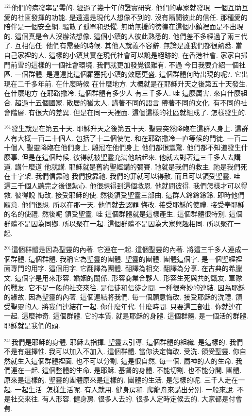 \documentclass{book}
\begin{document}
$^{121}$他們的病發率是零的.
經過了幾十年的證實研究.
他們的專家就發現.
一個互助互愛的社區發揮的功能.
是遠遠是現代人想像不到的.
沒有隔閡彼此的信任.
那種愛的陪伴是一個安全網.
驅散了孤單和恐懼.
無助無援的徬徨在這個小鎮裡面是不出現的.
這個真是令人沒辦法想像.
這個小鎮的人彼此熟悉的.
他們差不多經過了兩三代了.
互相信任.
他們有需要的時候.
其他人就義不容辭.
無論是誰我們都很熟悉.
當自己家裡的人.
這樣的小鎮其實在現代社會可以說是絕跡的.
在香港社會.
家家自掃門前雪的這樣的一個社會環境.
我們就更加發覺很難有.
不過 今日我要介紹一個社區.
一個群體.
是遠遠比這個羅塞托小鎮的效應更盛.
這個群體何時出現的呢?.
它出現在二千多年前.
在什麼時候 在什麼地方.
大概就是在耶穌升天之後第五十天發生.
在什麼地方 在耶路撒冷.
這個群體有多少人 有三千多人.
哇 這麼厲害.
來自什麼組合.
超過十五個國家.
散居的猶太人.
講著不同的語言 帶著不同的文化.
有不同的社會階層.
有很大的差異.
但是在同一天裡面.
這個這樣的社區就組成了.
怎樣發生的.

$^{161}$發生就是在第五十天.
耶穌升天之後第五十天.
聖靈突然降臨在這群人身上.
這群人有大概一百二十個人.
包括了十二個使徒.
和在耶路撒冷一直等候的門徒.
一百二十個人 聖靈降臨在他們身上.
雕冠在他們身上 他們都很震驚.
他們都不知道發生什麼事.
但是在這個時候.
彼得就被聖靈充滿他站起來.
他就去對著這三千多人去講道.
講什麼道 他就講.
耶穌就是舊約聖經講的彌賽.
祂就是我們的救主.
祂是我們死在十字架.
我們信靠祂 我們投靠祂.
我們的罪就可以得赦.
而且可以領受聖靈.
哇 這三千個人聽完之後很紮心.
他很想得到這個救恩.
他就問彼得.
我們怎樣才可以得救.
彼得說 悔改.
接受耶穌的使.
然後領受聖靈三部曲.
這群人鈴鈴鈴鈴.
即時他們願意.
他們很想.
所以在那一天.
他們就去認罪 悔改.
接受耶穌的使禮.
接受奉耶穌的名的使禮.
然後呢 領受聖靈.
哇 這個群體就是這樣產生.
這個群體很特別.
這個群體不是因為同鄉.
所以聚在一起.
這個群體不是因為大家興趣相同.
所以聚在一起.

$^{201}$這個群體是因為聖靈的內著.
它連在一起.
這個聖靈的內著.
將這三千多人連成一個群體.
這個群體.
我稱它為聖靈的團體.
聖靈的團體.
團體這個字.
是一個聖經裡面專門的用字.
這個用字.
它翻譯為團體.
翻譯為相交.
翻譯為分享.
在古典的希臘文.
這個字是用來形容.
婚姻的關係.
形容商業合夥人.
形容生死與共的戰友.
軍隊的戰友.
它不是一般的社交來往.
是信徒和信徒之間.
一種很奇妙的連結.
因為耶穌的緣故.
因為聖靈的內著.
這個連結將我們.
每一個願意悔改.
接受耶穌的洗禮.
領受聖靈的人.
將我們連結在一起.
你什麼年代.
什麼時間.
只要這三部曲.
你就連在一起.
這麼神奇.
這個群體.
它的本質.
就是耶穌的身體.
這個群體.
是一個活的群體.
耶穌就是我們的頭.

$^{241}$我們是耶穌的身體.
耶穌去指揮.
聖靈去引導.
這個群體的組織.
是這樣的.
我們不是有選擇性.
我可以加入不加入.
這個群體.
當你決定悔改.
受洗.
領受聖靈.
你自然就生入這個群體裡面.
也不可以分割.
這是很自然.
每一個.
屬神的人的生命.
我們連在一起.
這個整體的生命.
是耶穌.
基督的身體.
不能切割.
也不能分開.
團體.
原來是這樣的.
聖靈的團體原來是這樣的.
團體的生活.
是怎樣的呢.
三千人走在一起.
一起生活.
怎樣生活呢.
有人就用.
健身房和.
爬龍舟來講出分別.
一般來說.
不是社交來往.
有人形容.
健身房.
很多人去的.
很多人定時定候去的.
大家都是付會費.
\end{document}
